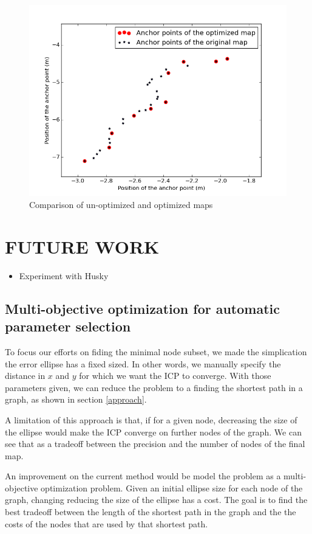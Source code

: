 \documentclass[letterpaper,10 pt,conference]{ieeeconf}
\begin{document}
\begin{figure}
  \centering
  \includegraphics[scale=0.4]{map_optimization}
  \caption{Comparison of un-optimized and optimized maps}
\end{figure}


\section{FUTURE WORK}

\begin{itemize}
  \item Experiment with Husky
\end{itemize}

\subsection{Multi-objective optimization for automatic parameter selection}

To focus our efforts on fiding the minimal node subset, we made the simplication the error ellipse has a fixed sized.
In other words, we manually specify the distance in $x$ and $y$ for which we want the ICP to converge. With those parameters given,
we can reduce the problem to a finding the shortest path in a graph, as shown in section \ref{approach}.


A limitation of this approach is that, if for a given node, decreasing the size of the ellipse would make the ICP
converge on further nodes of the graph. We can see that as a tradeoff between the precision and the number of nodes of the final map.


An improvement on the current method would be model the problem as a multi-objective optimization problem. Given an initial
ellipse size for each node of the graph, changing reducing the size of the ellipse has a cost. The goal is to find the best
tradeoff between the length of the shortest path in the graph and the the costs of the nodes that are used by that shortest path.
\end{document}
